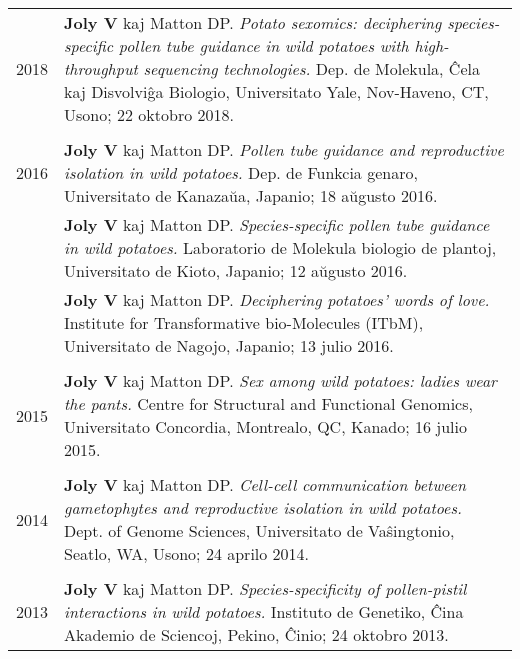 \documentclass[letterpaper,12pt]{article}
\begin{document}
\begin{tabularx}{\textwidth}{@{}r|X@{}}

2018
& \textbf{Joly V} kaj Matton DP.
  \emph{Potato sexomics: deciphering species-specific pollen tube guidance in
  wild potatoes with high-throughput sequencing technologies.}
  Dep. de Molekula, Ĉela kaj Disvolviĝa Biologio,
  Universitato Yale, Nov-Haveno, CT, Usono;
  22 oktobro 2018.
  \\

\multicolumn{2}{c}{} \\

2016
& \textbf{Joly V} kaj Matton DP.
  \emph{Pollen tube guidance and reproductive isolation in wild potatoes.}
  Dep. de Funkcia genaro,
  Universitato de Kanazaŭa, Japanio;
  18 aŭgusto 2016.
  \vspace{1.5mm}
  \\

& \textbf{Joly V} kaj Matton DP.
  \emph{Species-specific pollen tube guidance in wild potatoes.}
  Laboratorio de Molekula biologio de plantoj,
  Universitato de Kioto, Japanio;
  12 aŭgusto 2016.
  \vspace{1.5mm}
  \\

& \textbf{Joly V} kaj Matton DP.
  \emph{Deciphering potatoes’ words of love.}
  Institute for Transformative bio-Molecules (ITbM),
  Universitato de Nagojo, Japanio;
  13 julio 2016.
  \\

\multicolumn{2}{c}{} \\

2015
& \textbf{Joly V} kaj Matton DP.
  \emph{Sex among wild potatoes: ladies wear the pants.}
  Centre for Structural and Functional Genomics,
  Universitato Concordia, Montrealo, QC, Kanado;
  16 julio 2015.
  \\

\multicolumn{2}{c}{} \\

2014
& \textbf{Joly V} kaj Matton DP.
  \emph{Cell-cell communication between gametophytes and reproductive isolation
  in wild potatoes.}
  Dept. of Genome Sciences, Universitato de Vaŝingtonio, Seatlo, WA, Usono;
  24 aprilo 2014.
  \\

\multicolumn{2}{c}{} \\

2013
& \textbf{Joly V} kaj Matton DP.
  \emph{Species-specificity of pollen-pistil interactions in wild potatoes.}
  Instituto de Genetiko, Ĉina Akademio de Sciencoj, Pekino, Ĉinio;
  24 oktobro 2013. 
  \\

\end{tabularx}
\end{document}
